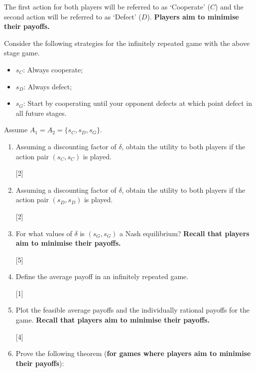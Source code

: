 \documentclass[12pt,a4paper,twoside]{article}
\begin{document}
\begin{enumerate}
        The first action for both players will be referred to as `Cooperate'
            (\(C\)) and the second action will be referred to as `Defect' (\(D\)). \textbf{Players aim to minimise their payoffs.}

        Consider the following strategies for the infinitely repeated game with
            the above stage game.

            \begin{itemize}
                \item \(s_C\): Always cooperate;
                \item \(s_D\): Always defect;
                \item \(s_G\): Start by cooperating until your opponent defects at which point defect in all future stages.
            \end{itemize}

        Assume $A_1=A_2=\{s_C,s_D,s_G\}$.

    \begin{enumerate}

            \item Assuming a discounting factor of \(\delta\), obtain the
                utility to both players if the action pair \((s_C,s_C)\) is played.

            \hfill[2]

            \item Assuming a discounting factor of \(\delta\), obtain the
                utility to both players if the action pair \((s_D,s_D)\) is played.

            \hfill[2]

            \item For what values of \(\delta\) is \((s_G, s_G)\) a Nash equilibrium? \textbf{Recall that players aim to minimise their payoffs.}

            \hfill[5]

            \item Define the average payoff in an infinitely repeated game.

            \hfill[1]

            \item Plot the feasible average payoffs and the individually
                rational payoffs for the game. \textbf{Recall that players aim to minimise their payoffs.}

            \hfill[4]

            \item Prove the following theorem (\textbf{for games where players aim to minimise their payoffs}):


\end{enumerate}
\end{enumerate}
\end{document}
